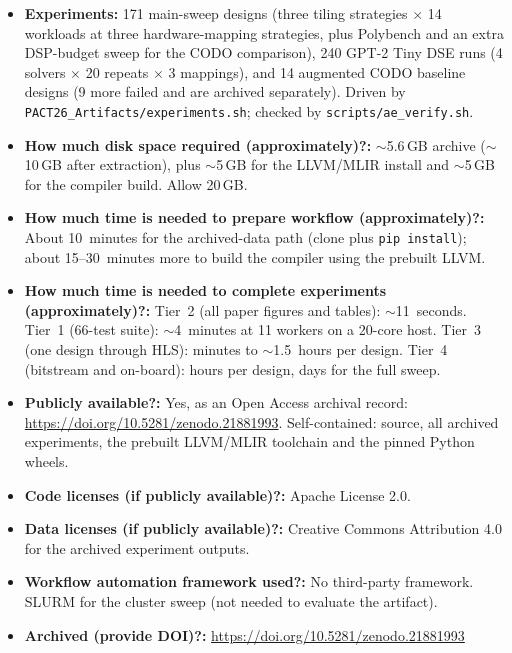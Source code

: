 {\begin{itemize}
    \texttt{codo.csv}, \texttt{gpt2\_dse\_traces.csv}), seven figure PDFs and four
    \LaTeX{} tables, corresponding to Figures~3--6 and Tables~4--7 of the paper.
  \item {\bf Experiments: } 171 main-sweep designs (three tiling strategies
    $\times$ 14 workloads at three hardware-mapping strategies, plus Polybench and an
    extra DSP-budget sweep for the CODO comparison), 240 GPT-2 Tiny DSE runs
    (4 solvers $\times$ 20 repeats $\times$ 3 mappings), and 14 augmented CODO
    baseline designs (9 more failed and are archived separately). Driven by
    \texttt{PACT26\_Artifacts/experiments.sh}; checked by \texttt{scripts/ae\_verify.sh}.
  \item {\bf How much disk space required (approximately)?: } $\sim$5.6\,GB archive
    ($\sim$10\,GB after extraction), plus $\sim$5\,GB for the LLVM/MLIR install and
    $\sim$5\,GB for the compiler build. Allow 20\,GB.
  \item {\bf How much time is needed to prepare workflow (approximately)?: } About
    10~minutes for the archived-data path (clone plus \texttt{pip install}); about
    15--30~minutes more to build the compiler using the prebuilt LLVM.
  \item {\bf How much time is needed to complete experiments (approximately)?: }
    Tier~2 (all paper figures and tables): $\sim$11~seconds. Tier~1 (66-test suite):
    $\sim$4~minutes at 11 workers on a 20-core host. Tier~3 (one design through HLS):
    minutes to $\sim$1.5~hours per design. Tier~4 (bitstream and on-board): hours per design, days
    for the full sweep.
  \item {\bf Publicly available?: } Yes, as an Open Access archival record: \url{https://doi.org/10.5281/zenodo.21881993}.
    Self-contained: source, all archived experiments, the prebuilt LLVM/MLIR toolchain
    and the pinned Python wheels.
  \item {\bf Code licenses (if publicly available)?: } Apache License 2.0.
  \item {\bf Data licenses (if publicly available)?: } Creative Commons Attribution 4.0
    for the archived experiment outputs.
  \item {\bf Workflow automation framework used?: } No third-party framework. SLURM
    for the cluster sweep (not needed to evaluate the artifact).
  \item {\bf Archived (provide DOI)?: } \url{https://doi.org/10.5281/zenodo.21881993}
\end{itemize}
}

